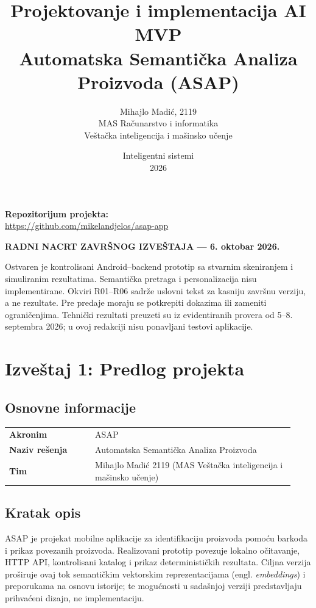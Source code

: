 \documentclass[12pt,a4paper]{article}
\title{Projektovanje i implementacija AI MVP\\[0.4em]
  \large Automatska Semantička Analiza Proizvoda (ASAP)}
\author{Mihajlo Madić, 2119\\
  MAS Računarstvo i informatika\\
  Veštačka inteligencija i mašinsko učenje}
\date{Inteligentni sistemi\\2026}
\begin{document}
\maketitle
\begin{center}
\textbf{Repozitorijum projekta:}\\
\url{https://github.com/mikelandjelos/asap-app}
\end{center}
\begin{center}
\textbf{RADNI NACRT ZAVRŠNOG IZVEŠTAJA --- 6. oktobar 2026.}
\end{center}
Ostvaren je kontrolisani Android--backend prototip sa stvarnim skeniranjem i
simuliranim rezultatima. Semantička pretraga i personalizacija nisu implementirane.
Okviri R01--R06 sadrže uslovni tekst za kasniju završnu verziju, a ne rezultate.
Pre predaje moraju se potkrepiti dokazima ili zameniti ograničenjima.
Tehnički rezultati preuzeti su iz evidentiranih provera od 5--8. septembra 2026;
u ovoj redakciji nisu ponavljani testovi aplikacije.
\newpage
\tableofcontents
\newpage

\section{Izveštaj 1: Predlog projekta}

\subsection{Osnovne informacije}

\begin{tabular}{>{\bfseries}p{0.28\linewidth}p{0.65\linewidth}}
Akronim & ASAP \\
Naziv rešenja & Automatska Semantička Analiza Proizvoda \\
Tim & Mihajlo Madić 2119 (MAS Veštačka inteligencija i mašinsko učenje) \\
\end{tabular}

\subsection{Kratak opis}

ASAP je projekat mobilne aplikacije za identifikaciju proizvoda pomoću barkoda i prikaz povezanih proizvoda. Realizovani prototip povezuje lokalno očitavanje, HTTP API, kontrolisani katalog i prikaz determinističkih rezultata. Ciljna verzija proširuje ovaj tok semantičkim vektorskim reprezentacijama (engl. \textit{embeddings}) i preporukama na osnovu istorije; te mogućnosti u sadašnjoj verziji predstavljaju prihvaćeni dizajn, ne implementaciju.
\end{document}
